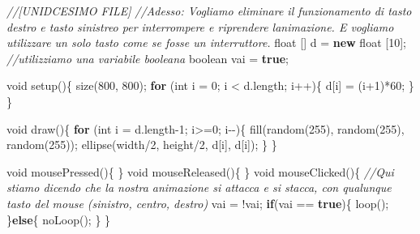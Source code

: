 \documentclass[
]{article}
\newenvironment{Shaded}{}{}
\newcommand{\CommentTok}[1]{\textcolor[rgb]{0.38,0.63,0.69}{\textit{#1}}}
\newcommand{\ControlFlowTok}[1]{\textcolor[rgb]{0.00,0.44,0.13}{\textbf{#1}}}
\newcommand{\DataTypeTok}[1]{\textcolor[rgb]{0.56,0.13,0.00}{#1}}
\newcommand{\DecValTok}[1]{\textcolor[rgb]{0.25,0.63,0.44}{#1}}
\newcommand{\FunctionTok}[1]{\textcolor[rgb]{0.02,0.16,0.49}{#1}}
\newcommand{\KeywordTok}[1]{\textcolor[rgb]{0.00,0.44,0.13}{\textbf{#1}}}
\newcommand{\NormalTok}[1]{#1}
\newcommand{\OperatorTok}[1]{\textcolor[rgb]{0.40,0.40,0.40}{#1}}
\begin{document}
\begin{Shaded}
\begin{Highlighting}[]
\CommentTok{//[UNIDCESIMO FILE]}
\CommentTok{//Adesso: Vogliamo eliminare il funzionamento di tasto destro e tasto sinistreo per interrompere e riprendere l\textquotesingle{}animazione. E vogliamo utilizzare un solo tasto come se fosse un interruttore.}
\DataTypeTok{float} \OperatorTok{[]}\NormalTok{ d }\OperatorTok{=} \KeywordTok{new} \DataTypeTok{float} \OperatorTok{[}\DecValTok{10}\OperatorTok{];} 
\CommentTok{//utilizziamo una variabile booleana}
\DataTypeTok{boolean}\NormalTok{ vai }\OperatorTok{=} \KeywordTok{true}\OperatorTok{;}

\DataTypeTok{void} \FunctionTok{setup}\OperatorTok{()\{}
  \FunctionTok{size}\OperatorTok{(}\DecValTok{800}\OperatorTok{,} \DecValTok{800}\OperatorTok{);}
  \ControlFlowTok{for} \OperatorTok{(}\DataTypeTok{int}\NormalTok{ i }\OperatorTok{=} \DecValTok{0}\OperatorTok{;}\NormalTok{ i }\OperatorTok{\textless{}}\NormalTok{ d}\OperatorTok{.}\FunctionTok{length}\OperatorTok{;}\NormalTok{ i}\OperatorTok{++)\{}
\NormalTok{    d}\OperatorTok{[}\NormalTok{i}\OperatorTok{]} \OperatorTok{=} \OperatorTok{(}\NormalTok{i}\OperatorTok{+}\DecValTok{1}\OperatorTok{)*}\DecValTok{60}\OperatorTok{;}
  \OperatorTok{\}}
\OperatorTok{\}}

\DataTypeTok{void} \FunctionTok{draw}\OperatorTok{()\{}
  \ControlFlowTok{for} \OperatorTok{(}\DataTypeTok{int}\NormalTok{ i }\OperatorTok{=}\NormalTok{ d}\OperatorTok{.}\FunctionTok{length}\OperatorTok{{-}}\DecValTok{1}\OperatorTok{;}\NormalTok{ i}\OperatorTok{\textgreater{}=}\DecValTok{0}\OperatorTok{;}\NormalTok{ i}\OperatorTok{{-}{-})\{}
    \FunctionTok{fill}\OperatorTok{(}\FunctionTok{random}\OperatorTok{(}\DecValTok{255}\OperatorTok{),} \FunctionTok{random}\OperatorTok{(}\DecValTok{255}\OperatorTok{),} \FunctionTok{random}\OperatorTok{(}\DecValTok{255}\OperatorTok{));}
    \FunctionTok{ellipse}\OperatorTok{(}\NormalTok{width}\OperatorTok{/}\DecValTok{2}\OperatorTok{,}\NormalTok{ height}\OperatorTok{/}\DecValTok{2}\OperatorTok{,}\NormalTok{ d}\OperatorTok{[}\NormalTok{i}\OperatorTok{],}\NormalTok{ d}\OperatorTok{[}\NormalTok{i}\OperatorTok{]);}
  \OperatorTok{\}}
  \OperatorTok{\}}

  \DataTypeTok{void} \FunctionTok{mousePressed}\OperatorTok{()\{}
  \OperatorTok{\}}
  \DataTypeTok{void} \FunctionTok{mouseReleased}\OperatorTok{()\{}
  \OperatorTok{\}}
  \DataTypeTok{void} \FunctionTok{mouseClicked}\OperatorTok{()\{}
    \CommentTok{//Qui stiamo dicendo che la nostra animazione si attacca e si stacca, con qualunque tasto del mouse (sinistro, centro, destro)}
\NormalTok{    vai }\OperatorTok{=} \OperatorTok{!}\NormalTok{vai}\OperatorTok{;}
    \ControlFlowTok{if}\OperatorTok{(}\NormalTok{vai }\OperatorTok{==} \KeywordTok{true}\OperatorTok{)\{}
        \FunctionTok{loop}\OperatorTok{();}
    \OperatorTok{\}}\ControlFlowTok{else}\OperatorTok{\{}
        \FunctionTok{noLoop}\OperatorTok{();}
    \OperatorTok{\}}
  \OperatorTok{\}}


\end{Highlighting}
\end{Shaded}
\end{document}
